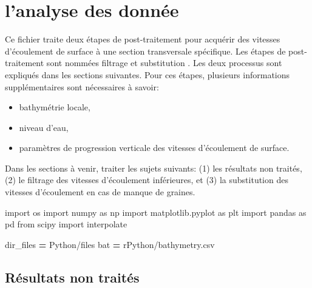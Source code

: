 \documentclass[
]{article}
\newenvironment{Shaded}{\begin{snugshade}}{\end{snugshade}}
\newcommand{\ImportTok}[1]{#1}
\newcommand{\NormalTok}[1]{#1}
\newcommand{\OperatorTok}[1]{\textcolor[rgb]{0.81,0.36,0.00}{\textbf{#1}}}
\newcommand{\StringTok}[1]{\textcolor[rgb]{0.31,0.60,0.02}{#1}}
\newcommand{\VerbatimStringTok}[1]{\textcolor[rgb]{0.31,0.60,0.02}{#1}}
\begin{document}
\hypertarget{ad}{%
\section*{l'analyse des donnée}\label{ad}}

Ce fichier traite deux étapes de post-traitement pour acquérir des vitesses d'écoulement de surface à une section transversale spécifique. Les étapes de post-traitement sont nommées filtrage et substitution . Les deux processus sont expliqués dans les sections suivantes. Pour ces étapes, plusieurs informations supplémentaires sont nécessaires à savoir:

\begin{itemize}
\item
  bathymétrie locale,
\item
  niveau d'eau,
\item
  paramètres de progression verticale des vitesses d'écoulement de surface.
\end{itemize}

Dans les sections à venir, traiter les sujets suivants: (1) les résultats non traités, (2) le filtrage des vitesses d'écoulement inférieures, et (3) la substitution des vitesses d'écoulement en cas de manque de graines.

\begin{Shaded}
\begin{Highlighting}[]
\ImportTok{import}\NormalTok{ os}
\ImportTok{import}\NormalTok{ numpy }\ImportTok{as}\NormalTok{ np}
\ImportTok{import}\NormalTok{ matplotlib.pyplot }\ImportTok{as}\NormalTok{ plt}
\ImportTok{import}\NormalTok{ pandas }\ImportTok{as}\NormalTok{ pd}
\ImportTok{from}\NormalTok{ scipy }\ImportTok{import}\NormalTok{ interpolate}
\end{Highlighting}
\end{Shaded}

\begin{Shaded}
\begin{Highlighting}[]
\NormalTok{dir\_files }\OperatorTok{=} \StringTok{\textquotesingle{}Python/files\textquotesingle{}}
\NormalTok{bat }\OperatorTok{=} \VerbatimStringTok{r\textquotesingle{}Python/bathymetry.csv\textquotesingle{}}
\end{Highlighting}
\end{Shaded}

\hypertarget{ruxe9sultats-non-traituxe9s}{%
\subsection*{Résultats non traités}\label{ruxe9sultats-non-traituxe9s}}
\end{document}
